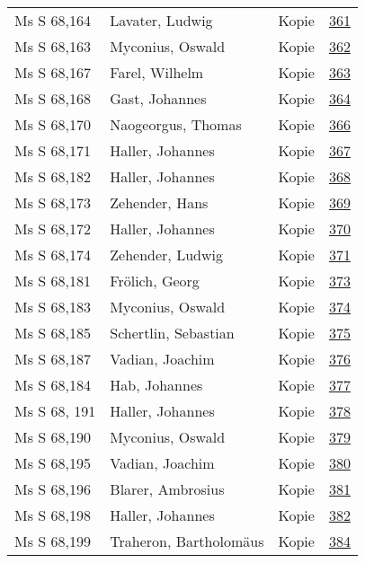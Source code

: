 \documentclass[10pt,a4paper,landscape]{report}
\begin{document}
\begin{longtable}{p{16cm}p{4cm}lr}
Ms S 68,164	&	Lavater, Ludwig	&	Kopie	&	\href{http://130.60.24.72/assignment/361}{361}\\
Ms S 68,163	&	Myconius, Oswald	&	Kopie	&	\href{http://130.60.24.72/assignment/362}{362}\\
Ms S 68,167	&	Farel, Wilhelm	&	Kopie	&	\href{http://130.60.24.72/assignment/363}{363}\\
Ms S 68,168	&	Gast, Johannes	&	Kopie	&	\href{http://130.60.24.72/assignment/364}{364}\\
Ms S 68,170	&	Naogeorgus, Thomas	&	Kopie	&	\href{http://130.60.24.72/assignment/366}{366}\\
Ms S 68,171	&	Haller, Johannes	&	Kopie	&	\href{http://130.60.24.72/assignment/367}{367}\\
Ms S 68,182	&	Haller, Johannes	&	Kopie	&	\href{http://130.60.24.72/assignment/368}{368}\\
Ms S 68,173	&	Zehender, Hans	&	Kopie	&	\href{http://130.60.24.72/assignment/369}{369}\\
Ms S 68,172	&	Haller, Johannes	&	Kopie	&	\href{http://130.60.24.72/assignment/370}{370}\\
Ms S 68,174	&	Zehender, Ludwig	&	Kopie	&	\href{http://130.60.24.72/assignment/371}{371}\\
Ms S 68,181	&	Frölich, Georg	&	Kopie	&	\href{http://130.60.24.72/assignment/373}{373}\\
Ms S 68,183	&	Myconius, Oswald	&	Kopie	&	\href{http://130.60.24.72/assignment/374}{374}\\
Ms S 68,185	&	Schertlin, Sebastian	&	Kopie	&	\href{http://130.60.24.72/assignment/375}{375}\\
Ms S 68,187	&	Vadian, Joachim	&	Kopie	&	\href{http://130.60.24.72/assignment/376}{376}\\
Ms S 68,184	&	Hab, Johannes	&	Kopie	&	\href{http://130.60.24.72/assignment/377}{377}\\
Ms S 68, 191	&	Haller, Johannes	&	Kopie	&	\href{http://130.60.24.72/assignment/378}{378}\\
Ms S 68,190	&	Myconius, Oswald	&	Kopie	&	\href{http://130.60.24.72/assignment/379}{379}\\
Ms S 68,195	&	Vadian, Joachim	&	Kopie	&	\href{http://130.60.24.72/assignment/380}{380}\\
Ms S 68,196	&	Blarer, Ambrosius	&	Kopie	&	\href{http://130.60.24.72/assignment/381}{381}\\
Ms S 68,198	&	Haller, Johannes	&	Kopie	&	\href{http://130.60.24.72/assignment/382}{382}\\
Ms S 68,199	&	Traheron, Bartholomäus	&	Kopie	&	\href{http://130.60.24.72/assignment/384}{384}\\

\end{longtable}
\end{document}
